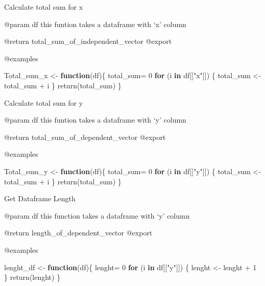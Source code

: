 \documentclass[
]{article}
\newenvironment{Shaded}{\begin{snugshade}}{\end{snugshade}}
\newcommand{\ControlFlowTok}[1]{\textcolor[rgb]{0.13,0.29,0.53}{\textbf{#1}}}
\newcommand{\DecValTok}[1]{\textcolor[rgb]{0.00,0.00,0.81}{#1}}
\newcommand{\FunctionTok}[1]{\textcolor[rgb]{0.00,0.00,0.00}{#1}}
\newcommand{\NormalTok}[1]{#1}
\newcommand{\OtherTok}[1]{\textcolor[rgb]{0.56,0.35,0.01}{#1}}
\newcommand{\SpecialCharTok}[1]{\textcolor[rgb]{0.00,0.00,0.00}{#1}}
\newcommand{\StringTok}[1]{\textcolor[rgb]{0.31,0.60,0.02}{#1}}
\begin{document}
Calculate total sum for x

@param df this funtion takes a dataframe with `x' column

@return total\_sum\_of\_independent\_vector @export

@examples

\begin{Shaded}
\begin{Highlighting}[]
\NormalTok{Total\_sum\_x }\OtherTok{\textless{}{-}} \ControlFlowTok{function}\NormalTok{(df)\{}
\NormalTok{  total\_sum}\OtherTok{=} \DecValTok{0}
  \ControlFlowTok{for}\NormalTok{ (i }\ControlFlowTok{in}\NormalTok{ df[[}\StringTok{"x"}\NormalTok{]]) \{}
\NormalTok{    total\_sum }\OtherTok{\textless{}{-}}\NormalTok{ total\_sum }\SpecialCharTok{+}\NormalTok{ i}
\NormalTok{  \}}
  \FunctionTok{return}\NormalTok{(total\_sum)}
\NormalTok{\}}
\end{Highlighting}
\end{Shaded}

Calculate total sum for y

@param df this funtion takes a dataframe with `y' column

@return total\_sum\_of\_dependent\_vector @export

@examples

\begin{Shaded}
\begin{Highlighting}[]
\NormalTok{Total\_sum\_y }\OtherTok{\textless{}{-}} \ControlFlowTok{function}\NormalTok{(df)\{}
\NormalTok{  total\_sum}\OtherTok{=} \DecValTok{0}
  \ControlFlowTok{for}\NormalTok{ (i }\ControlFlowTok{in}\NormalTok{ df[[}\StringTok{"y"}\NormalTok{]]) \{}
\NormalTok{    total\_sum }\OtherTok{\textless{}{-}}\NormalTok{ total\_sum }\SpecialCharTok{+}\NormalTok{ i}
\NormalTok{  \}}
  \FunctionTok{return}\NormalTok{(total\_sum)}
\NormalTok{\}}
\end{Highlighting}
\end{Shaded}

Get Dataframe Length

@param df this function takes a dataframe with `y' column

@return length\_of\_dependent\_vector @export

@examples

\begin{Shaded}
\begin{Highlighting}[]
\NormalTok{lenght\_df }\OtherTok{\textless{}{-}} \ControlFlowTok{function}\NormalTok{(df)\{}
\NormalTok{  lenght}\OtherTok{=} \DecValTok{0}
  \ControlFlowTok{for}\NormalTok{ (i }\ControlFlowTok{in}\NormalTok{ df[[}\StringTok{"y"}\NormalTok{]]) \{}
\NormalTok{    lenght }\OtherTok{\textless{}{-}}\NormalTok{ lenght }\SpecialCharTok{+} \DecValTok{1}
\NormalTok{  \}}
  \FunctionTok{return}\NormalTok{(lenght)}
\NormalTok{\}}
\end{Highlighting}
\end{Shaded}
\end{document}
